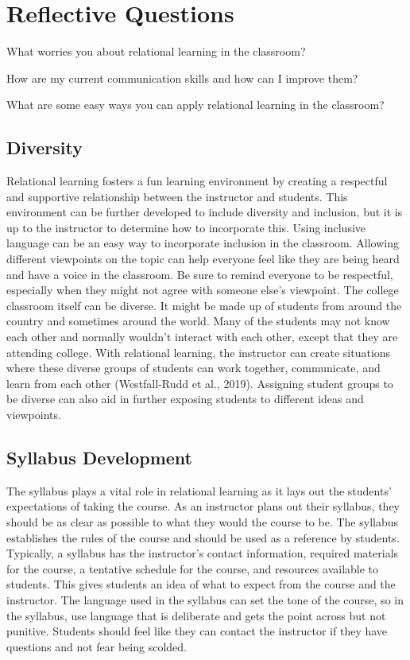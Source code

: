 \documentclass{book}
\begin{document}
\hypertarget{reflective-questions}{%
\section{Reflective Questions}\label{reflective-questions}}

What worries you about relational learning in the classroom?

How are my current communication skills and how can I improve them?

What are some easy ways you can apply relational learning in the classroom?

\hypertarget{diversity}{%
\subsection{Diversity}\label{diversity}}

Relational learning fosters a fun learning environment by creating a
respectful and supportive relationship between the instructor and students.
This environment can be further developed to include diversity and inclusion,
but it is up to the instructor to determine how to incorporate this. Using
inclusive language can be an easy way to incorporate inclusion in the
classroom. Allowing different viewpoints on the topic can help everyone feel
like they are being heard and have a voice in the classroom. Be sure to remind
everyone to be respectful, especially when they might not agree with someone
else's viewpoint. The college classroom itself can be diverse. It might be
made up of students from around the country and sometimes around the world.
Many of the students may not know each other and normally wouldn't interact
with each other, except that they are attending college. With relational
learning, the instructor can create situations where these diverse groups of
students can work together, communicate, and learn from each other
(Westfall-Rudd et al., 2019). Assigning student groups to be diverse can also
aid in further exposing students to different ideas and viewpoints.~

\hypertarget{syllabus-development}{%
\subsection{Syllabus Development~}\label{syllabus-development}}

The syllabus plays a vital role in relational learning as it lays out the
students' expectations of taking the course. As an instructor plans out their
syllabus, they should be as clear as possible to what they would the course to
be. The syllabus establishes the rules of the course and should be used as a
reference by students. Typically, a syllabus has the instructor's contact
information, required materials for the course, a tentative schedule for the
course, and resources available to students. This gives students an idea of
what to expect from the course and the instructor. The language used in the
syllabus can set the tone of the course, so in the syllabus, use language that
is deliberate and gets the point across but not punitive. Students should feel
like they can contact the instructor if they have questions and not fear being
scolded.~
\end{document}
